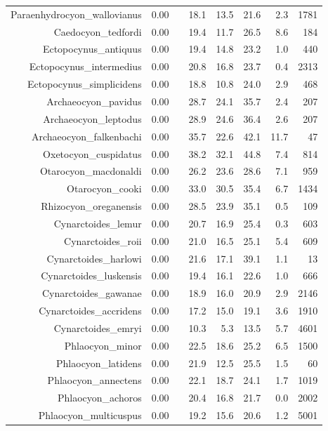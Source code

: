 \begin{table}[ht]
\begin{tabular}{rrrrrrrr}
  Paraenhydrocyon\_wallovianus & 0.00 &  & 18.1 & 13.5 & 21.6 & 2.3 & 1781 \\ 
  Caedocyon\_tedfordi & 0.00 &  & 19.4 & 11.7 & 26.5 & 8.6 & 184 \\ 
  Ectopocynus\_antiquus & 0.00 &  & 19.4 & 14.8 & 23.2 & 1.0 & 440 \\ 
  Ectopocynus\_intermedius & 0.00 &  & 20.8 & 16.8 & 23.7 & 0.4 & 2313 \\ 
  Ectopocynus\_simplicidens & 0.00 &  & 18.8 & 10.8 & 24.0 & 2.9 & 468 \\ 
  Archaeocyon\_pavidus & 0.00 &  & 28.7 & 24.1 & 35.7 & 2.4 & 207 \\ 
  Archaeocyon\_leptodus & 0.00 &  & 28.9 & 24.6 & 36.4 & 2.6 & 207 \\ 
  Archaeocyon\_falkenbachi & 0.00 &  & 35.7 & 22.6 & 42.1 & 11.7 & 47 \\ 
  Oxetocyon\_cuspidatus & 0.00 &  & 38.2 & 32.1 & 44.8 & 7.4 & 814 \\ 
  Otarocyon\_macdonaldi & 0.00 &  & 26.2 & 23.6 & 28.6 & 7.1 & 959 \\ 
  Otarocyon\_cooki & 0.00 &  & 33.0 & 30.5 & 35.4 & 6.7 & 1434 \\ 
  Rhizocyon\_oreganensis & 0.00 &  & 28.5 & 23.9 & 35.1 & 0.5 & 109 \\ 
  Cynarctoides\_lemur & 0.00 &  & 20.7 & 16.9 & 25.4 & 0.3 & 603 \\ 
  Cynarctoides\_roii & 0.00 &  & 21.0 & 16.5 & 25.1 & 5.4 & 609 \\ 
  Cynarctoides\_harlowi & 0.00 &  & 21.6 & 17.1 & 39.1 & 1.1 & 13 \\ 
  Cynarctoides\_luskensis & 0.00 &  & 19.4 & 16.1 & 22.6 & 1.0 & 666 \\ 
  Cynarctoides\_gawanae & 0.00 &  & 18.9 & 16.0 & 20.9 & 2.9 & 2146 \\ 
  Cynarctoides\_accridens & 0.00 &  & 17.2 & 15.0 & 19.1 & 3.6 & 1910 \\ 
  Cynarctoides\_emryi & 0.00 &  & 10.3 & 5.3 & 13.5 & 5.7 & 4601 \\ 
  Phlaocyon\_minor & 0.00 &  & 22.5 & 18.6 & 25.2 & 6.5 & 1500 \\ 
  Phlaocyon\_latidens & 0.00 &  & 21.9 & 12.5 & 25.5 & 1.5 & 60 \\ 
  Phlaocyon\_annectens & 0.00 &  & 22.1 & 18.7 & 24.1 & 1.7 & 1019 \\ 
  Phlaocyon\_achoros & 0.00 &  & 20.4 & 16.8 & 21.7 & 0.0 & 2002 \\ 
  Phlaocyon\_multicuspus & 0.00 &  & 19.2 & 15.6 & 20.6 & 1.2 & 5001 \\ 

\end{tabular}
\end{table}
